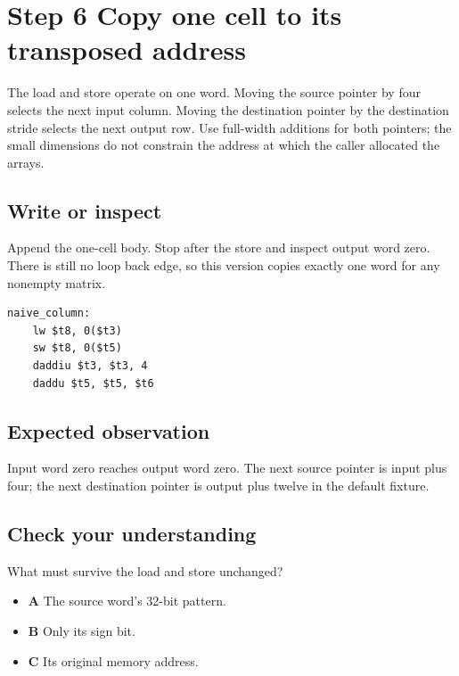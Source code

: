 \section{Step 6 Copy one cell to its transposed address}\label{transpose-s06}

The load and store operate on one word. Moving the source pointer by four selects the next input column. Moving the destination pointer by the destination stride selects the next output row. Use full-width additions for both pointers; the small dimensions do not constrain the address at which the caller allocated the arrays.

\subsection{Write or inspect}
Append the one-cell body. Stop after the store and inspect output word zero. There is still no loop back edge, so this version copies exactly one word for any nonempty matrix.

\begin{verbatim}
naive_column:
    lw $t8, 0($t3)
    sw $t8, 0($t5)
    daddiu $t3, $t3, 4
    daddu $t5, $t5, $t6
\end{verbatim}

\subsection{Expected observation}
Input word zero reaches output word zero. The next source pointer is input plus four; the next destination pointer is output plus twelve in the default fixture.

\subsection{Check your understanding}
What must survive the load and store unchanged?

\begin{itemize}
  \item \textbf{A} The source word’s 32-bit pattern.
  \item \textbf{B} Only its sign bit.
  \item \textbf{C} Its original memory address.
\end{itemize}
